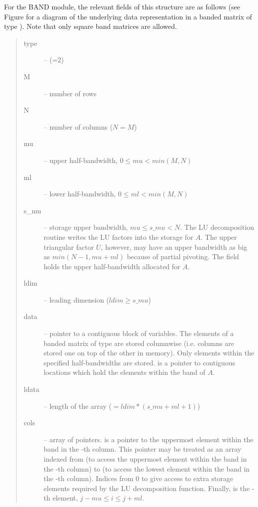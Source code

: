 \documentclass[letterpaper,10pt,english]{sphinxmanual}
\begin{document}
For the BAND module, the relevant fields of this structure are as
follows (see Figure {\hyperref[linear_solvers/DLS:dls-figure]{\emph{}}} for a diagram of
the underlying data representation in a banded matrix of type
{\hyperref[linear_solvers/DLS:c.DlsMat]{\emph{}}}). Note that only square band matrices are allowed.
\begin{quote}\begin{description}
\item[{type}] \leavevmode
--  (=2)

\item[{M}] \leavevmode
-- number of rows

\item[{N}] \leavevmode
-- number of columns (\(N = M\))

\item[{mu}] \leavevmode
-- upper half-bandwidth, \(0 \le mu < min(M,N)\)

\item[{ml}] \leavevmode
-- lower half-bandwidth, \(0 \le ml < min(M,N)\)

\item[{s\_mu}] \leavevmode
-- storage upper bandwidth, \(mu \le s\_mu < N\). The LU
decomposition routine writes the LU factors into the storage for
\(A\). The upper triangular factor \(U\), however, may
have an upper bandwidth as big as \(min(N-1,mu+ml)\) because
of partial pivoting. The  field holds the upper
half-bandwidth allocated for \(A\).

\item[{ldim}] \leavevmode
-- leading dimension (\(ldim \ge s\_mu\))

\item[{data}] \leavevmode
-- pointer to a contiguous block of 
variables. The elements of a banded matrix of type
{\hyperref[linear_solvers/DLS:c.DlsMat]{\emph{}}} are stored columnwise (i.e. columns are stored
one on top of the other in memory). Only elements within the
specified half-bandwidths are stored.  is a pointer to
 contiguous locations which hold the elements within the
band of \(A\).

\item[{ldata}] \leavevmode
-- length of the  array (\(= ldim*(s\_mu+ml+1)\))

\item[{cols}] \leavevmode
-- array of pointers.  is a pointer to the
uppermost element within the band in the -th column. This
pointer may be treated as an array indexed from  (to
access the uppermost element within the band in the -th
column) to  (to access the lowest element within the
band in the -th column). Indices from 0 to  give
access to extra storage elements required by the LU decomposition
function. Finally,  is the -th
element, \(j-mu \le i \le j+ml\).

\end{description}\end{quote}
\end{document}
